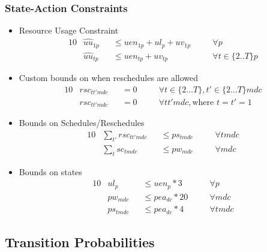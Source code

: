 \documentclass{article}
\begin{document}
\subsubsection{State-Action Constraints}
\label{state-action constraints}
\begin{itemize}

	\item Resource Usage Constraint
	\begin{alignat}{10}
			& \hat{uu}_{1p} 
			&& \le uen_{1p} + ul_{p} + uv_{1p} \quad 
			&& \forall p \\
		& \hat{uu}_{tp} 
			&& \le uen_{tp} + uv_{tp} \quad
			&& \forall t \in \{ 2..T \}p 
	\end{alignat}
	
	\item Custom bounds on when reschedules are allowed
	\begin{alignat}{10}
		& rsc_{tt'mdc} && = 0 \quad && \forall t \in \{ 2...T \}, t' \in \{2...T\} mdc \\
		& rsc_{tt'mdc} && = 0 \quad && \forall tt'mdc, \text{where } t=t'=1 
	\end{alignat}  
	
	\item Bounds on Schedules/Reschedules
	\begin{alignat}{10}
		& \sum_{t'} rsc_{tt'mdc} 	&& \le ps_{tmdc} \quad  && \forall tmdc  \\
		& \sum_{t} sc_{tmdc} 		&& \le pw_{mdc} \quad 	&& \forall mdc 
	\end{alignat}  
	
	\item Bounds on states
	\begin{alignat}{10}
		& ul_{p} 	&& \le uen_{p} * 3 \quad 	&& \forall p \\
		& pw_{mdc} 	&& \le pea_{dc} * 20 \quad 			&& \forall mdc \\
		& ps_{tmdc} && \le pea_{dc} * 4 \quad 			&& \forall tmdc
	\end{alignat}
\end{itemize}

\subsection{Transition Probabilities}
\end{document}
